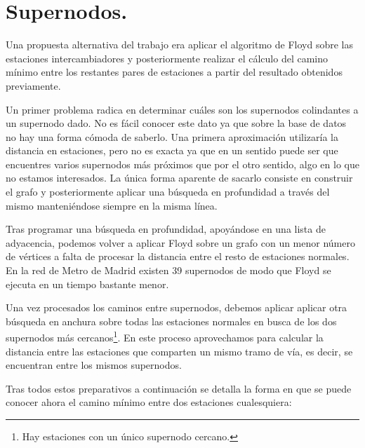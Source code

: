 \documentclass[spanish, a4paper, 12pt] {article}
\begin{document}
\section{Supernodos.}
Una propuesta alternativa del trabajo era aplicar el algoritmo de Floyd sobre las estaciones intercambiadores y posteriormente realizar el cálculo del camino mínimo entre los restantes pares de estaciones a partir del resultado obtenidos previamente.\\ \par
Un primer problema radica en determinar cuáles son los supernodos colindantes a un supernodo dado. No es fácil conocer este dato ya que sobre la base de datos no hay una forma cómoda de saberlo. Una primera aproximación utilizaría la distancia en estaciones, pero no es exacta ya que en un sentido puede ser que encuentres varios supernodos más próximos que por el otro sentido, algo en lo que no estamos interesados. La única forma aparente de sacarlo consiste en construir el grafo y posteriormente aplicar una búsqueda en profundidad a través del mismo manteniéndose siempre en la misma línea.\\ \par
Tras programar una búsqueda en profundidad, apoyándose en una lista de adyacencia, podemos volver a aplicar Floyd sobre un grafo con un menor número de vértices a falta de procesar la distancia entre el resto de estaciones normales. En la red de Metro de Madrid existen 39 supernodos de modo que Floyd se ejecuta en un tiempo bastante menor.\\ \par
Una vez procesados los caminos entre supernodos, debemos aplicar aplicar otra búsqueda en anchura sobre todas las estaciones normales en busca de los dos supernodos más cercanos\footnote{Hay estaciones con un único supernodo cercano.}. En este proceso aprovechamos para calcular la distancia entre las estaciones que comparten un mismo tramo de vía, es decir, se encuentran entre los mismos supernodos. \\ \par
Tras todos estos preparativos a continuación se detalla la forma en que se puede conocer ahora el camino mínimo entre dos estaciones cualesquiera:
\end{document}
